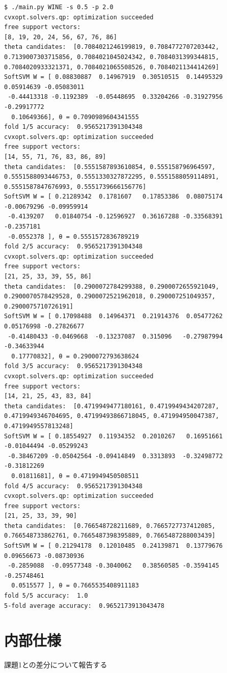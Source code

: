 \documentclass{jsarticle}
\begin{document}
\begin{lstlisting}
$ ./main.py WINE -s 0.5 -p 2.0
cvxopt.solvers.qp: optimization succeeded
free support vectors: 
[8, 19, 20, 24, 56, 67, 76, 86]
theta candidates:  [0.7084021246199819, 0.7084772707203442, 0.7139007303715856, 0.7084021045024342, 0.7084031399344815, 0.7084020933321371, 0.7084021065508526, 0.7084021134414269]
SoftSVM W = [ 0.08830887  0.14967919  0.30510515  0.14495329  0.05914639 -0.05083011
 -0.44413318 -0.1192389  -0.05448695  0.33204266 -0.31927956 -0.29917772
  0.10649366], θ = 0.7090989604341555
fold 1/5 accuracy:  0.9565217391304348
cvxopt.solvers.qp: optimization succeeded
free support vectors: 
[14, 55, 71, 76, 83, 86, 89]
theta candidates:  [0.5551587893610854, 0.555158796964597, 0.5551588093446753, 0.5551330327872295, 0.5551588059114891, 0.5551587847676993, 0.5551739666156776]
SoftSVM W = [ 0.21289342  0.1781607   0.17853386  0.08075174 -0.00679296 -0.09959914
 -0.4139207   0.01840754 -0.12596927  0.36167288 -0.33568391 -0.2357181
 -0.0552378 ], θ = 0.5551572836789219
fold 2/5 accuracy:  0.9565217391304348
cvxopt.solvers.qp: optimization succeeded
free support vectors: 
[21, 25, 33, 39, 55, 86]
theta candidates:  [0.2900072784299388, 0.2900072655921049, 0.2900070578429528, 0.2900072521962018, 0.290007251049357, 0.2900075710726191]
SoftSVM W = [ 0.17098488  0.14964371  0.21914376  0.05477262  0.05176998 -0.27826677
 -0.41480433 -0.0469668  -0.13237087  0.315096   -0.27987994 -0.34633944
  0.17770832], θ = 0.2900072793638624
fold 3/5 accuracy:  0.9565217391304348
cvxopt.solvers.qp: optimization succeeded
free support vectors: 
[14, 21, 25, 43, 83, 84]
theta candidates:  [0.4719949477180161, 0.4719949434207287, 0.4719949346704695, 0.47199493866718045, 0.471994950047387, 0.4719949557813248]
SoftSVM W = [ 0.18554927  0.11934352  0.2010267   0.16951661 -0.01044494 -0.05299243
 -0.38467209 -0.05042564 -0.09414849  0.3313893  -0.32498772 -0.31812269
  0.01811681], θ = 0.4719949450508511
fold 4/5 accuracy:  0.9565217391304348
cvxopt.solvers.qp: optimization succeeded
free support vectors: 
[21, 25, 33, 39, 90]
theta candidates:  [0.766548728211689, 0.7665727737412085, 0.766548733862761, 0.7665487398395889, 0.7665487288003439]
SoftSVM W = [ 0.21294178  0.12010485  0.24139871  0.13779676  0.09656673 -0.08730936
 -0.2859088  -0.09577348 -0.3040062   0.38560585 -0.3594145  -0.25748461
  0.0515577 ], θ = 0.7665535408911183
fold 5/5 accuracy:  1.0
5-fold average accuracy:  0.9652173913043478
\end{lstlisting}
\section{内部仕様}
課題1との差分について報告する
\end{document}
